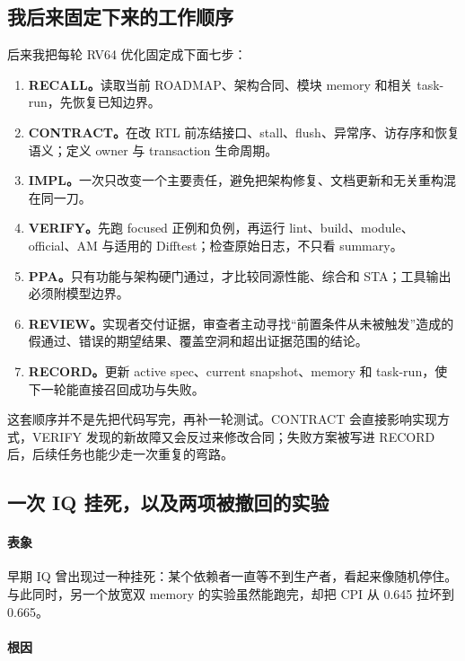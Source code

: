 \documentclass[UTF8,a4paper,zihao=-4,oneside]{ctexart}
\begin{document}
\subsection{我后来固定下来的工作顺序}

后来我把每轮 RV64 优化固定成下面七步：

\begin{enumerate}
  \item \textbf{RECALL。}读取当前 ROADMAP、架构合同、模块 memory 和相关 task-run，先恢复已知边界。
  \item \textbf{CONTRACT。}在改 RTL 前冻结接口、stall、flush、异常序、访存序和恢复语义；定义 owner 与 transaction 生命周期。
  \item \textbf{IMPL。}一次只改变一个主要责任，避免把架构修复、文档更新和无关重构混在同一刀。
  \item \textbf{VERIFY。}先跑 focused 正例和负例，再运行 lint、build、module、official、AM 与适用的 Difftest；检查原始日志，不只看 summary。
  \item \textbf{PPA。}只有功能与架构硬门通过，才比较同源性能、综合和 STA；工具输出必须附模型边界。
  \item \textbf{REVIEW。}实现者交付证据，审查者主动寻找“前置条件从未被触发”造成的假通过、错误的期望结果、覆盖空洞和超出证据范围的结论。
  \item \textbf{RECORD。}更新 active spec、current snapshot、memory 和 task-run，使下一轮能直接召回成功与失败。
\end{enumerate}

这套顺序并不是先把代码写完，再补一轮测试。CONTRACT 会直接影响实现方式，VERIFY 发现的新故障又会反过来修改合同；失败方案被写进 RECORD 后，后续任务也能少走一次重复的弯路。

\subsection{一次 IQ 挂死，以及两项被撤回的实验}

\paragraph{表象}

早期 IQ 曾出现过一种挂死：某个依赖者一直等不到生产者，看起来像随机停住。与此同时，另一个放宽双 memory 的实验虽然能跑完，却把 CPI 从 0.645 拉坏到 0.665。

\paragraph{根因}
\end{document}
